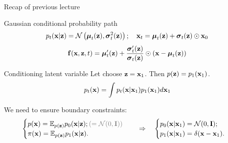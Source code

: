 \begin{frame}{Recap of previous lecture}
	\begin{block}{Gaussian conditional probability path}
		\vspace{-0.3cm}
		\[
			p_t(\mathbf{x} | \mathbf{z}) = \mathcal{N}\left(\boldsymbol{\mu}_t(\mathbf{z}), \boldsymbol{\sigma}_t^2(\mathbf{z})\right); \quad \mathbf{x}_t = \boldsymbol{\mu}_t(\mathbf{z}) + \boldsymbol{\sigma}_t(\mathbf{z}) \odot \mathbf{x}_0
		\]
		\vspace{-0.3cm}
		\[
			\mathbf{f}(\mathbf{x}, \mathbf{z}, t) =  \boldsymbol{\mu}_t'(\mathbf{z}) + \frac{\boldsymbol{\sigma}_t'(\mathbf{z})}{\boldsymbol{\sigma}_t(\mathbf{z})} \odot (\mathbf{x} - \boldsymbol{\mu}_t(\mathbf{z}))
		\]
		\vspace{-0.3cm}
	\end{block}
	\begin{block}{Conditioning latent variable}
		Let choose $\mathbf{z} = \mathbf{x}_1$. Then $p(\mathbf{z}) = p_1(\mathbf{x}_1)$.
		\[
			p_t(\mathbf{x}) = \int p_t(\mathbf{x} | \mathbf{x}_1) p_1(\mathbf{x}_1) d \mathbf{x}_1
		\]
		\vspace{-0.5cm}
	\end{block}
	We need to ensure boundary constraints:
	\[
		\begin{cases}
			p(\bx) = \bbE_{p(\bz)} p_0(\bx | \bz); {\color{gray}(= \cN(0, \bI))} \\
			\pi(\bx) = \bbE_{p(\bz)} p_1(\bx | \bz).
		\end{cases}
		\quad \Rightarrow \quad 
		\begin{cases}
			p_0(\bx | \bx_1) = \cN(0, \bI); \\
			p_1(\bx | \bx_1) = \delta(\bx - \bx_1).
		\end{cases}
	\]
	\vspace{-0.3cm}
\end{frame}
